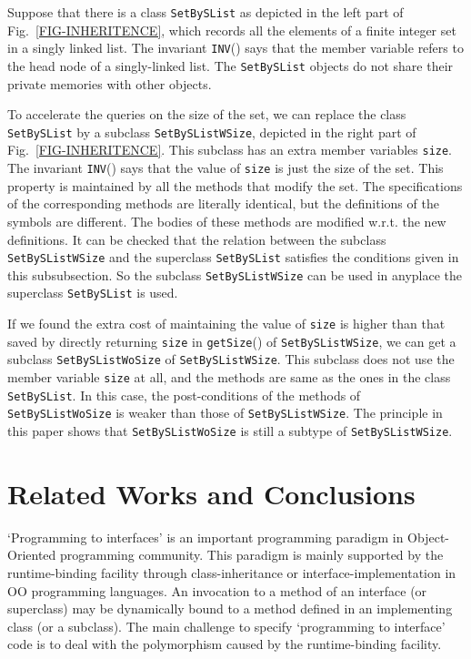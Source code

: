 \documentclass[fleqn]{llncs}
\begin{document}
\begin{example}
Suppose that there is a class \texttt{SetBySList} as depicted in the left part of Fig.~\ref{FIG-INHERITENCE}, which records all the elements of a finite integer set in a singly linked list.
The invariant \texttt{INV}() says that the member variable  refers to the head node of a singly-linked list.
The \texttt{SetBySList} objects do not share their private memories with other objects.

To accelerate the queries on the size of the set,  we can replace the class \texttt{SetBySList} by a subclass \texttt{SetBySListWSize}, depicted in the right part of Fig.~\ref{FIG-INHERITENCE}.
This subclass has an extra member variables \texttt{size}.
The invariant \texttt{INV}() says that the value of \texttt{size} is just the size of the set.
This property is maintained by all the methods that modify the set.
The specifications of the corresponding methods are literally identical, but the definitions of the symbols
are different. The bodies of these methods are modified w.r.t. the new definitions.
It can be checked that the relation between the subclass \texttt{SetBySListWSize} and the superclass \texttt{SetBySList} satisfies the
conditions given in this subsubsection. So the subclass \texttt{SetBySListWSize} can be used in anyplace the superclass \texttt{SetBySList} is used.

If we found the extra cost of maintaining the value of \texttt{size} is higher than that saved by directly returning \texttt{size} in \texttt{getSize}() of \texttt{SetBySListWSize},
we can get a subclass \texttt{SetBySListWoSize} of \texttt{SetBySListWSize}.
This subclass does not use the member variable \texttt{size} at all, and the methods are same as the ones
in the class \texttt{SetBySList}. In this case, the post-conditions of the methods of \texttt{SetBySListWoSize} is weaker than those of \texttt{SetBySListWSize}.
The principle in this paper shows that \texttt{SetBySListWoSize} is still a subtype of \texttt{SetBySListWSize}.
\hfill
\end{example}

\section{Related Works and Conclusions}\label{SEC-CONCLUSION}
`Programming to interfaces' is an important programming paradigm in Object-Oriented programming community.
This paradigm is mainly supported by the runtime-binding facility through class-inheritance or interface-implementation
in OO programming languages. An invocation to a method of an interface (or superclass) may be dynamically bound to a method defined in an implementing class (or a subclass).
The main challenge to specify `programming to interface' code is to deal with the polymorphism
caused by the runtime-binding facility.
\end{document}
